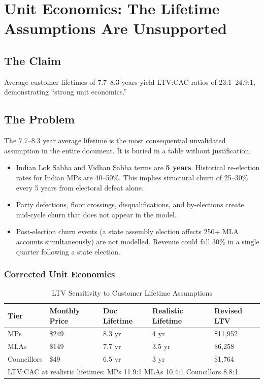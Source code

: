 \documentclass[12pt, a4paper]{article}
\begin{document}
\newpage

\section{Unit Economics: The Lifetime Assumptions Are Unsupported}

\subsection{The Claim}
Average customer lifetimes of 7.7--8.3 years yield LTV:CAC ratios of 23:1--24.9:1, demonstrating ``strong unit economics.''

\subsection{The Problem}

The 7.7--8.3 year average lifetime is the most consequential unvalidated assumption in the entire document. It is buried in a table without justification.

\begin{itemize}[leftmargin=1.5em]
    \item Indian Lok Sabha and Vidhan Sabha terms are \textbf{5 years}. Historical re-election rates for Indian MPs are 40--50\%. This implies structural churn of 25--30\% every 5 years from electoral defeat alone.
    \item Party defections, floor crossings, disqualifications, and by-elections create mid-cycle churn that does not appear in the model.
    \item Post-election churn events (a state assembly election affects 250+ MLA accounts simultaneously) are not modelled. Revenue could fall 30\% in a single quarter following a state election.
\end{itemize}

\subsubsection{Corrected Unit Economics}

\begin{table}[h!]
\centering
\caption{LTV Sensitivity to Customer Lifetime Assumptions}
\renewcommand{\arraystretch}{1.3}
\begin{tabularx}{\textwidth}{lXXXX}
\toprule
\rowcolor{rowblue}
\textbf{Tier} & \textbf{Monthly Price} & \textbf{Doc Lifetime} & \textbf{Realistic Lifetime} & \textbf{Revised LTV} \\
\midrule
MPs     & \$249 & 8.3 yr & 4 yr & \$11,952 \\
MLAs    & \$149 & 7.7 yr & 3.5 yr & \$6,258 \\
Councillors & \$49 & 6.5 yr & 3 yr & \$1,764 \\
\midrule
\multicolumn{5}{l}{\small LTV:CAC at realistic lifetimes: MPs 11.9:1 \quad MLAs 10.4:1 \quad Councillors 8.8:1} \\
\bottomrule
\end{tabularx}
\end{table}
\end{document}
